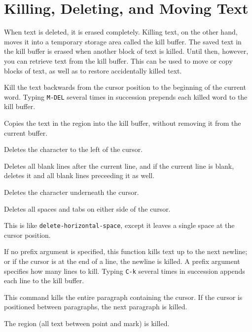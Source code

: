 \chapter{Killing, Deleting, and Moving Text}

When text is deleted, it is erased completely.  Killing text, on the
other hand, moves it into a temporary storage area called the kill
buffer.  The saved text in the kill buffer is erased when another
block of text is killed.  Until then, however, you can retrieve text
from the kill buffer.  This can be used to move or copy blocks of
text, as well as to restore accidentally killed text.

\fbody Kill the text backwards from the cursor position to the beginning
of the current word.  Typing {\tt M-DEL} several times in succession 
prepends each killed word to the kill buffer.

\fbody Copies the text in the region into the kill buffer, without removing
it from the current buffer.

\fbody Deletes the character to the left of the cursor.

\fbody Deletes all blank lines after the current line, and if the current
line is blank, deletes it and all blank lines preceeding it as well.

\fbody Deletes the character underneath the cursor.

\fbody Deletes all spaces and tabs on either side of the cursor.

\fbody This is like {\tt delete-horizontal-space}, except it leaves a single
space at the cursor position.

\fbody If no prefix argument is specified, this function kills text up
to the next newline; or if the cursor is at the end of a line, the newline
is killed.  A prefix argument specifies how many lines to kill.  Typing
{\tt C-k} several times in succession appends each line to the kill buffer.

\fbody This command kills the entire paragraph containing the cursor.
If the cursor is positioned between paragraphs, the next paragraph is killed.

\fbody The region (all text between point and mark) is killed.

